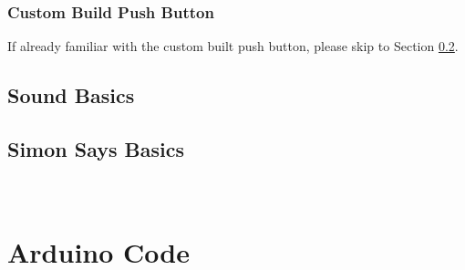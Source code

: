 \documentclass[12pt,letterpaper,oneside]{article}
\begin{document}
			\subsubsection{Custom Build Push Button} \label{sec:push}
			If already familiar with the custom built push button, please skip to Section \ref{sec:simon}. 
								
		\subsection{Sound Basics} \label{sec:sound}
		
		\subsection{Simon Says Basics} \label{sec:simon}

\newpage
\appendix
\section{\\Arduino Code} \label{App:AppendixA}

	
\newpage		
\printbibliography
\end{document}
